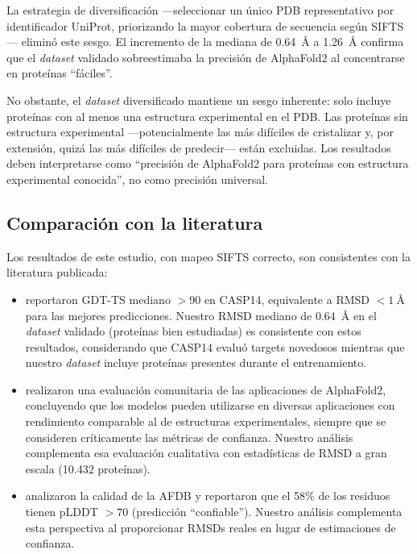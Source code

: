 La estrategia de diversificaci\'on ---seleccionar un \'unico PDB representativo por
identificador UniProt, priorizando la mayor cobertura de secuencia seg\'un SIFTS---
elimin\'o este sesgo. El incremento de la mediana de \SI{0,64}{\angstrom} a
\SI{1,26}{\angstrom} confirma que el \textit{dataset} validado sobreestimaba la precisi\'on de
AlphaFold2 al concentrarse en prote\'inas ``f\'aciles''.

No obstante, el \textit{dataset} diversificado mantiene un sesgo inherente: solo incluye
prote\'inas con al menos una estructura experimental en el PDB. Las prote\'inas sin
estructura experimental ---potencialmente las m\'as dif\'iciles de cristalizar y, por
extensi\'on, quiz\'a las m\'as dif\'iciles de predecir--- est\'an excluidas. Los
resultados deben interpretarse como ``precisi\'on de AlphaFold2 para prote\'inas con
estructura experimental conocida'', no como precisi\'on universal.

\subsection{Comparaci\'on con la literatura}
\label{subsec:comparacion_literatura}

Los resultados de este estudio, con mapeo SIFTS correcto, son consistentes con la
literatura publicada:

\begin{itemize}
    \item \citet{jumper2021highly} reportaron GDT-TS mediano $> 90$ en CASP14,
    equivalente a RMSD $< \SI{1}{\angstrom}$ para las mejores predicciones. Nuestro
    RMSD mediano de \SI{0,64}{\angstrom} en el \textit{dataset} validado (prote\'inas bien
    estudiadas) es consistente con estos resultados, considerando que CASP14 evalu\'o
    targets novedosos mientras que nuestro \textit{dataset} incluye prote\'inas presentes durante
    el entrenamiento.

    \item \citet{akdel2022structural} realizaron una evaluaci\'on comunitaria de las
    aplicaciones de AlphaFold2, concluyendo que los modelos pueden utilizarse en
    diversas aplicaciones con rendimiento comparable al de estructuras experimentales,
    siempre que se consideren cr\'iticamente las m\'etricas de confianza. Nuestro
    an\'alisis complementa esa evaluaci\'on cualitativa con estad\'isticas de RMSD
    a gran escala (10.432 prote\'inas).

    \item \citet{varadi2022alphafold} analizaron la calidad de la AFDB y reportaron
    que el 58\% de los residuos tienen pLDDT $> 70$ (predicci\'on ``confiable''). Nuestro
    an\'alisis complementa esta perspectiva al proporcionar RMSDs reales en lugar de
    estimaciones de confianza.
\end{itemize}

